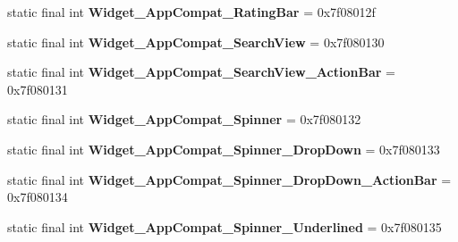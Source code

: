 \begin{DoxyCompactItemize}
\item 
\hypertarget{classandroid_1_1support_1_1v7_1_1appcompat_1_1_r_1_1style_a3162c72dc44f36cd6cc9874a45606128}{}static final int {\bfseries Widget\+\_\+\+App\+Compat\+\_\+\+Rating\+Bar} = 0x7f08012f\label{classandroid_1_1support_1_1v7_1_1appcompat_1_1_r_1_1style_a3162c72dc44f36cd6cc9874a45606128}

\item 
\hypertarget{classandroid_1_1support_1_1v7_1_1appcompat_1_1_r_1_1style_a0b9debe2b59a9eced1c10518295bd0a8}{}static final int {\bfseries Widget\+\_\+\+App\+Compat\+\_\+\+Search\+View} = 0x7f080130\label{classandroid_1_1support_1_1v7_1_1appcompat_1_1_r_1_1style_a0b9debe2b59a9eced1c10518295bd0a8}

\item 
\hypertarget{classandroid_1_1support_1_1v7_1_1appcompat_1_1_r_1_1style_a30aafb9867d041573f7441a2cc5508b0}{}static final int {\bfseries Widget\+\_\+\+App\+Compat\+\_\+\+Search\+View\+\_\+\+Action\+Bar} = 0x7f080131\label{classandroid_1_1support_1_1v7_1_1appcompat_1_1_r_1_1style_a30aafb9867d041573f7441a2cc5508b0}

\item 
\hypertarget{classandroid_1_1support_1_1v7_1_1appcompat_1_1_r_1_1style_af170a0011c6171b97922217fd714bfdb}{}static final int {\bfseries Widget\+\_\+\+App\+Compat\+\_\+\+Spinner} = 0x7f080132\label{classandroid_1_1support_1_1v7_1_1appcompat_1_1_r_1_1style_af170a0011c6171b97922217fd714bfdb}

\item 
\hypertarget{classandroid_1_1support_1_1v7_1_1appcompat_1_1_r_1_1style_a0911e8d3f56d1ceca6ee2f3e4dd58a57}{}static final int {\bfseries Widget\+\_\+\+App\+Compat\+\_\+\+Spinner\+\_\+\+Drop\+Down} = 0x7f080133\label{classandroid_1_1support_1_1v7_1_1appcompat_1_1_r_1_1style_a0911e8d3f56d1ceca6ee2f3e4dd58a57}

\item 
\hypertarget{classandroid_1_1support_1_1v7_1_1appcompat_1_1_r_1_1style_a6190a954e4f0646a2b8de6530e0bcd72}{}static final int {\bfseries Widget\+\_\+\+App\+Compat\+\_\+\+Spinner\+\_\+\+Drop\+Down\+\_\+\+Action\+Bar} = 0x7f080134\label{classandroid_1_1support_1_1v7_1_1appcompat_1_1_r_1_1style_a6190a954e4f0646a2b8de6530e0bcd72}

\item 
\hypertarget{classandroid_1_1support_1_1v7_1_1appcompat_1_1_r_1_1style_a185580641a1c211d234fd6a381680890}{}static final int {\bfseries Widget\+\_\+\+App\+Compat\+\_\+\+Spinner\+\_\+\+Underlined} = 0x7f080135\label{classandroid_1_1support_1_1v7_1_1appcompat_1_1_r_1_1style_a185580641a1c211d234fd6a381680890}


\end{DoxyCompactItemize}
